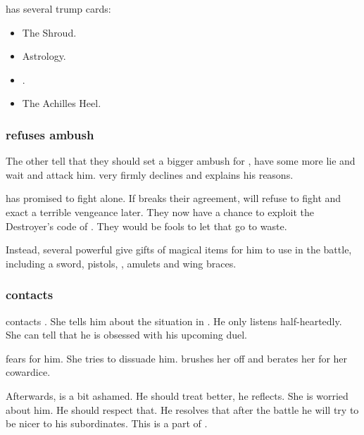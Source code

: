 \Teshrial{} has several trump cards:
\begin{itemize}
  \item The Shroud.
  \item Astrology. 
  \item \Noggyaleth.
  \item The Achilles Heel. 
\end{itemize}





\subsubsection{\Teshrial refuses ambush}
The other \resphain tell \Teshrial that they should set a bigger ambush for \Ishnaruchaefir, have some more \resphain lie and wait and attack him. 
\Teshrial very firmly declines and explains his reasons.

\Ishnaruchaefir has promised to fight \Teshrial alone.
If \Teshrial breaks their agreement, \Ishnaruchaefir will refuse to fight and exact a terrible vengeance later. 
They now have a chance to exploit the Destroyer's code of \honour. 
They would be fools to let that go to waste. 

Instead, several powerful \resphain give \Teshrial gifts of magical items for him to use in the battle, including a sword, pistols, \armour, amulets and wing braces.





\subsubsection{\Achsah contacts \Teshrial}
\Achsah contacts \Teshrial. 
She tells him about the situation in \Forclin.
He only listens half-heartedly.
She can tell that he is obsessed with his upcoming duel. 

\Achsah fears for him. 
She tries to dissuade him. 
\Teshrial brushes her off and berates her for her cowardice.

Afterwards, \Teshrial is a bit ashamed. 
He should treat \Achsah better, he reflects. 
She is worried about him.
He should respect that.
He resolves that after the battle he will try to be nicer to his \bezed subordinates.
This is a part of . 




